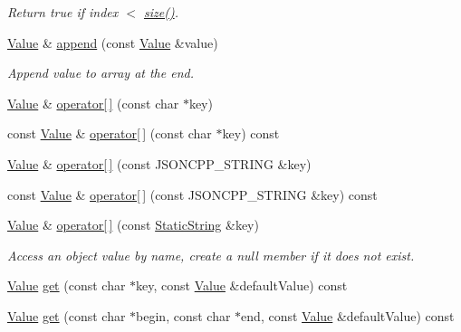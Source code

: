 \begin{DoxyCompactItemize}
\begin{DoxyCompactList}\small\item\em Return true if index $<$ \hyperlink{classJson_1_1Value_a4ca8ee6c48a34ca6c2f131956bab5e05}{size()}. \end{DoxyCompactList}\item 
\hyperlink{classJson_1_1Value}{Value} \& \hyperlink{classJson_1_1Value_a7e49ac977e4bcf59745a09d426669f75}{append} (const \hyperlink{classJson_1_1Value}{Value} \&value)
\begin{DoxyCompactList}\small\item\em Append value to array at the end. \end{DoxyCompactList}\item 
\hyperlink{classJson_1_1Value}{Value} \& \hyperlink{classJson_1_1Value_acb912f4ec40a25ea6eb387730885f3d9}{operator\mbox{[}$\,$\mbox{]}} (const char $\ast$key)
\item 
const \hyperlink{classJson_1_1Value}{Value} \& \hyperlink{classJson_1_1Value_ae5f73ffc7a039bca81b7ca771bc5db55}{operator\mbox{[}$\,$\mbox{]}} (const char $\ast$key) const 
\item 
\hyperlink{classJson_1_1Value}{Value} \& \hyperlink{classJson_1_1Value_aedd1e152756a4cc8c1ebac0dd7aeeb78}{operator\mbox{[}$\,$\mbox{]}} (const J\+S\+O\+N\+C\+P\+P\+\_\+\+S\+T\+R\+I\+NG \&key)
\item 
const \hyperlink{classJson_1_1Value}{Value} \& \hyperlink{classJson_1_1Value_a4b4d53dead79ee347514170bd21590b8}{operator\mbox{[}$\,$\mbox{]}} (const J\+S\+O\+N\+C\+P\+P\+\_\+\+S\+T\+R\+I\+NG \&key) const 
\item 
\hyperlink{classJson_1_1Value}{Value} \& \hyperlink{classJson_1_1Value_ac3763d7d315ca65dc188e273722f7955}{operator\mbox{[}$\,$\mbox{]}} (const \hyperlink{classJson_1_1StaticString}{Static\+String} \&key)
\begin{DoxyCompactList}\small\item\em Access an object value by name, create a null member if it does not exist. \end{DoxyCompactList}\item 
\hyperlink{classJson_1_1Value}{Value} \hyperlink{classJson_1_1Value_ab76b3323cde14c7db20676d07b260ce7}{get} (const char $\ast$key, const \hyperlink{classJson_1_1Value}{Value} \&default\+Value) const 
\item 
\hyperlink{classJson_1_1Value}{Value} \hyperlink{classJson_1_1Value_abcb2289c005bc0befdedaa94f662f63f}{get} (const char $\ast$begin, const char $\ast$end, const \hyperlink{classJson_1_1Value}{Value} \&default\+Value) const 

\end{DoxyCompactItemize}
